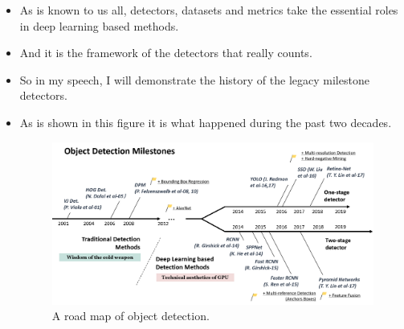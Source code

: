 \documentclass{beamer}
\begin{document}
\begin{frame}
    \begin{itemize}
        \item As is known to us all, detectors, datasets and metrics take the essential roles in deep learning based methods. 
        \item And it is the framework of the detectors that really counts. 
        \item So in my speech, I will demonstrate the history of the legacy milestone detectors. 
        
    \end{itemize}
\end{frame}

\begin{frame}
    \begin{itemize}
        \item As is shown in this figure it is what happened during the past two decades. 
        \begin{figure}[h!]
            \begin{center}
                \includegraphics[width=0.99\linewidth]{mile-stones.png}
                \caption{\small  A road map of object detection.}
            \end{center}
        \end{figure}
    
        
    \end{itemize}
\end{frame}
\end{document}
